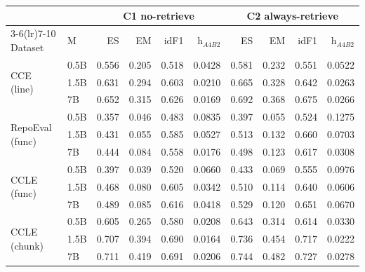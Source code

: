 \begin{tabular}{ll rrrr rrrr}
\toprule
 & & \multicolumn{4}{c}{\textbf{C1 no-retrieve}} & \multicolumn{4}{c}{\textbf{C2 always-retrieve}}\\
\cmidrule(lr){3-6}\cmidrule(lr){7-10}
Dataset & M & ES & EM & idF1 & h$_{A4B2}$ & ES & EM & idF1 & h$_{A4B2}$\\
\midrule
\multirow{3}{*}{CCE (line)} & 0.5B & 0.556 & 0.205 & 0.518 & 0.0428 & 0.581 & 0.232 & 0.551 & 0.0522\\
 & 1.5B & 0.631 & 0.294 & 0.603 & 0.0210 & 0.665 & 0.328 & 0.642 & 0.0263\\
 & 7B & 0.652 & 0.315 & 0.626 & 0.0169 & 0.692 & 0.368 & 0.675 & 0.0266\\
\midrule
\multirow{3}{*}{RepoEval (func)} & 0.5B & 0.357 & 0.046 & 0.483 & 0.0835 & 0.397 & 0.055 & 0.524 & 0.1275\\
 & 1.5B & 0.431 & 0.055 & 0.585 & 0.0527 & 0.513 & 0.132 & 0.660 & 0.0703\\
 & 7B & 0.444 & 0.084 & 0.558 & 0.0176 & 0.498 & 0.123 & 0.617 & 0.0308\\
\midrule
\multirow{3}{*}{CCLE (func)} & 0.5B & 0.397 & 0.039 & 0.520 & 0.0660 & 0.433 & 0.069 & 0.555 & 0.0976\\
 & 1.5B & 0.468 & 0.080 & 0.605 & 0.0342 & 0.510 & 0.114 & 0.640 & 0.0606\\
 & 7B & 0.489 & 0.085 & 0.616 & 0.0418 & 0.529 & 0.120 & 0.651 & 0.0670\\
\midrule
\multirow{3}{*}{CCLE (chunk)} & 0.5B & 0.605 & 0.265 & 0.580 & 0.0208 & 0.643 & 0.314 & 0.614 & 0.0330\\
 & 1.5B & 0.707 & 0.394 & 0.690 & 0.0164 & 0.736 & 0.454 & 0.717 & 0.0222\\
 & 7B & 0.711 & 0.419 & 0.691 & 0.0206 & 0.744 & 0.482 & 0.727 & 0.0278\\
\bottomrule
\end{tabular}